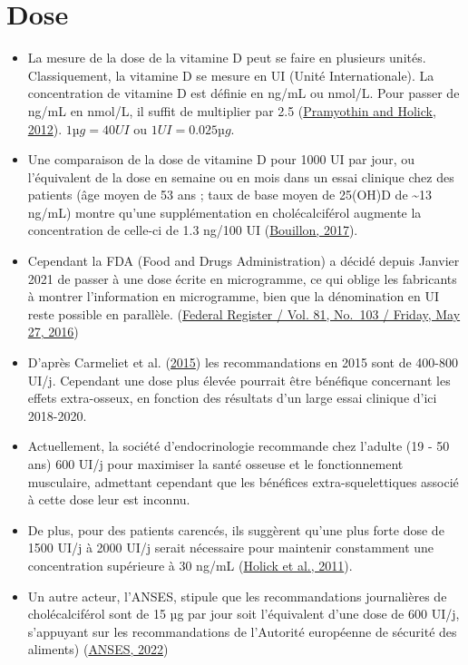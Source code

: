 \documentclass[
  a4paper,
  DIV=11,
  numbers=noendperiod,
  listof=totoc]{scrreprt}
\begin{document}
\hypertarget{dose}{%
\section{Dose}\label{dose}}

\begin{itemize}
\item
  La mesure de la dose de la vitamine D peut se faire en plusieurs
  unités. Classiquement, la vitamine D se mesure en UI (Unité
  Internationale). La concentration de vitamine D est définie en ng/mL
  ou nmol/L. Pour passer de ng/mL en nmol/L, il suffit de multiplier par
  2.5 (\protect\hyperlink{ref-Pramyothin.2012}{Pramyothin and Holick,
  2012}). \(1 µg = 40 UI\) ou \(1 UI = 0.025 µg\).
\item
  Une comparaison de la dose de vitamine D pour 1000 UI par jour, ou
  l'équivalent de la dose en semaine ou en mois dans un essai clinique
  chez des patients (âge moyen de 53 ans ; taux de base moyen de 25(OH)D
  de \textasciitilde13 ng/mL) montre qu'une supplémentation en
  cholécalciférol augmente la concentration de celle-ci de 1.3 ng/100 UI
  (\protect\hyperlink{ref-Bouillon.2017}{Bouillon, 2017}).
\item
  Cependant la FDA (Food and Drugs Administration) a décidé depuis
  Janvier 2021 de passer à une dose écrite en microgramme, ce qui oblige
  les fabricants à montrer l'information en microgramme, bien que la
  dénomination en UI reste possible en parallèle.
  (\href{https://www.govinfo.gov/content/pkg/FR-2016-05-27/pdf/2016-11867.pdf}{Federal
  Register / Vol. 81, No.~103 / Friday, May 27, 2016})
\item
  D'après Carmeliet et al.
  (\protect\hyperlink{ref-Carmeliet.2015}{2015}) les recommandations en
  2015 sont de 400-800 UI/j. Cependant une dose plus élevée pourrait
  être bénéfique concernant les effets extra-osseux, en fonction des
  résultats d'un large essai clinique d'ici 2018-2020.
\item
  Actuellement, la société d'endocrinologie recommande chez l'adulte (19
  - 50 ans) 600 UI/j pour maximiser la santé osseuse et le
  fonctionnement musculaire, admettant cependant que les bénéfices
  extra-squelettiques associé à cette dose leur est inconnu.
\item
  De plus, pour des patients carencés, ils suggèrent qu'une plus forte
  dose de 1500 UI/j à 2000 UI/j serait nécessaire pour maintenir
  constamment une concentration supérieure à 30 ng/mL
  (\protect\hyperlink{ref-Holick.2011}{Holick et al., 2011}).
\item
  Un autre acteur, l'ANSES, stipule que les recommandations journalières
  de cholécalciférol sont de 15 µg par jour soit l'équivalent d'une dose
  de 600 UI/j, s'appuyant sur les recommandations de l'Autorité
  européenne de sécurité des aliments)
  (\protect\hyperlink{ref-ANSES.2022}{ANSES, 2022})
\end{itemize}
\end{document}
